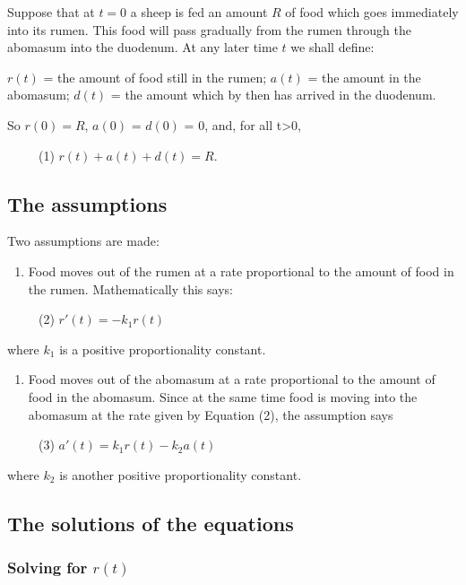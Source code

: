 \documentclass[]{article}
\providecommand{\tightlist}{%
  \setlength{\itemsep}{0pt}\setlength{\parskip}{0pt}}
\begin{document}
Suppose that at \(t = 0\) a sheep is fed an amount \(R\) of food which
goes immediately into its rumen. This food will pass gradually from the
rumen through the abomasum into the duodenum. At any later time \(t\) we
shall define:

\(r(t)\) = the amount of food still in the rumen; \(a(t)\) = the amount
in the abomasum; \(d(t)\) = the amount which by then has arrived in the
duodenum.

So \(r(0) = R\), \(a(0)\) = \(d(0)\) = 0, and, for all t\textgreater{}0,

~~~~~(1) \(r(t) + a(t) + d(t) = R.\)

\subsection{The assumptions}\label{the-assumptions}

Two assumptions are made:

\begin{enumerate}
\def\labelenumi{(\Alph{enumi})}
\tightlist
\item
  Food moves out of the rumen at a rate proportional to the amount of
  food in the rumen. Mathematically this says:
\end{enumerate}

~~~~~(2) \(r'(t) = -k_1r(t)\)

where \(k_1\) is a positive proportionality constant.

\begin{enumerate}
\def\labelenumi{(\Alph{enumi})}
\setcounter{enumi}{1}
\tightlist
\item
  Food moves out of the abomasum at a rate proportional to the amount of
  food in the abomasum. Since at the same time food is moving into the
  abomasum at the rate given by Equation (2), the assumption says
\end{enumerate}

~~~~~(3) \(a'(t) = k_1r(t)-k_2a(t)\)

where \(k_2\) is another positive proportionality constant.

\subsection{The solutions of the
equations}\label{the-solutions-of-the-equations}

\subsubsection{\texorpdfstring{Solving for
\(r(t)\)}{Solving for r(t)}}\label{solving-for-rt}
\end{document}
